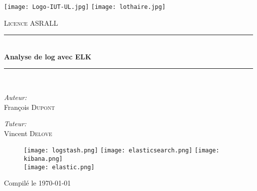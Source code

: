 \begin{titlepage}
\begin{center}
 \newcommand{\HRule}{\rule{\linewidth}{0.5mm}}

\texttt{[image: Logo-IUT-UL.jpg]}\hfill
\texttt{[image: lothaire.jpg]}
\vspace{1cm}

\textsc{\large Licence ASRALL}
\vspace{0.5cm}

\HRule \\[0.4cm]
{ \Large \bfseries Analyse de log avec ELK\\[0.4cm] }

\HRule \\[1.0cm]

\noindent
\begin{minipage}{0.5\textwidth}
\begin{flushleft} \large
\emph{Auteur:}\\
François \textsc{Dupont}\\
\end{flushleft}
\end{minipage}%
\begin{minipage}{0.5\textwidth}
\begin{flushright} \large
\emph{Tuteur:} \\
Vincent \textsc{Delove}
\end{flushright}
\end{minipage}

%
\vspace{1cm}

\begin{figure}[h]
    \centering
    \texttt{[image: logstash.png]}
    \hfill
    \texttt{[image: elasticsearch.png]}
    \hfill
    \texttt{[image: kibana.png]}
    \\[20mm]
    \texttt{[image: elastic.png]}
\end{figure}

\vspace{3mm}
{Compilé le \today}%

\end{center}
\end{titlepage}
